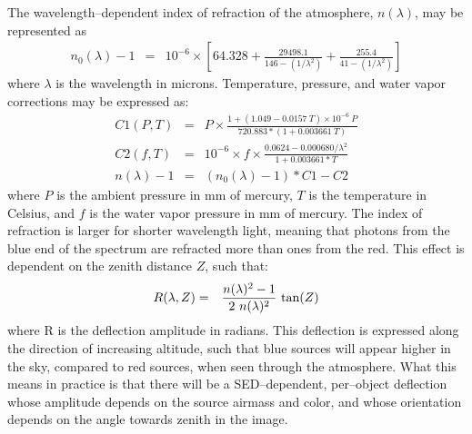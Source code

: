 \documentclass[DM,toc]{lsstdoc}
\begin{document}
The wavelength--dependent index of refraction of the atmosphere,
$n(\lambda)$, may be represented as
\begin{eqnarray}
\label{eqn:dcr0}
n_0(\lambda) - 1 & = & 10^{-6} \times \left[ 64.328 + \frac{29498.1}{146 - (1/\lambda^2)} + \frac{255.4}{41 - (1/\lambda^2)} \right]
\end{eqnarray}
where $\lambda$ is the wavelength in microns.  Temperature, pressure,
and water vapor corrections may be expressed as:
\begin{eqnarray}
\label{eqn:dcr}
C1(P,T) & = & P \times \frac{1 + (1.049 - 0.0157~T) \times 10^{-6}~P}{720.883 * (1 + 0.003661~T)} \\
C2(f,T) & = & 10^{-6} \times f \times \frac{0.0624 - 0.000680/\lambda^2}{1 + 0.003661 * T} \\
n(\lambda) - 1 & = & (n_0(\lambda) - 1) * C1 - C2
\end{eqnarray}
where $P$ is the ambient pressure in mm of mercury, $T$ is the
temperature in Celsius, and $f$ is the water vapor pressure in mm of
mercury.  The index of refraction is larger for shorter wavelength
light, meaning that photons from the blue end of the spectrum are
refracted more than ones from the red.  This effect is dependent on
the zenith distance $Z$, such that:
\begin{eqnarray}
R(\lambda, Z) & = & \frac{n(\lambda)^2 - 1}{2~n(\lambda)^2}~{\rm tan}(Z)
\end{eqnarray}
where R is the deflection amplitude in radians.  This deflection is
expressed along the direction of increasing altitude, such that blue
sources will appear higher in the sky, compared to red sources, when
seen through the atmosphere.  What this means in practice is that
there will be a SED--dependent, per--object deflection whose amplitude
depends on the source airmass and color, and whose orientation depends
on the angle towards zenith in the image.
\end{document}
